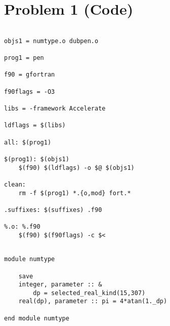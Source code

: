 \documentclass[12pt]{article}
\begin{document}
\section{Problem 1 (Code)}

\begin{lstlisting}[frame=single,caption={{\tt Makefile}},label=makefile]

objs1 = numtype.o dubpen.o 

prog1 = pen

f90 = gfortran

f90flags = -O3 

libs = -framework Accelerate

ldflags = $(libs)

all: $(prog1)

$(prog1): $(objs1)
	$(f90) $(ldflags) -o $@ $(objs1)

clean: 
	rm -f $(prog1) *.{o,mod} fort.*

.suffixes: $(suffixes) .f90

%.o: %.f90
	$(f90) $(f90flags) -c $<

\end{lstlisting}

\begin{lstlisting}[frame=single,caption={Module {\tt numtype}},label=numtype]

module numtype

    save
    integer, parameter :: &
        dp = selected_real_kind(15,307)
    real(dp), parameter :: pi = 4*atan(1._dp)

end module numtype

\end{lstlisting}
\end{document}
